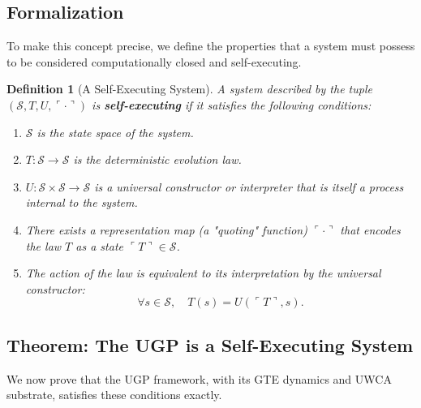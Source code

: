 \documentclass[12pt]{article}
\newtheorem{definition}[theorem]{Definition}
\begin{document}
\subsection{Formalization}
To make this concept precise, we define the properties that a system must possess to be considered computationally closed and self-executing.

\begin{definition}[A Self-Executing System]
\label{def:self_executing_system}
A system described by the tuple $(\mathcal{S}, T, U, \ulcorner \cdot \urcorner)$ is \textbf{self-executing} if it satisfies the following conditions:
\begin{enumerate}[label=(\roman*)]
    \item $\mathcal{S}$ is the state space of the system.
    \item $T: \mathcal{S} \to \mathcal{S}$ is the deterministic evolution law.
    \item $U: \mathcal{S} \times \mathcal{S} \to \mathcal{S}$ is a universal constructor or interpreter that is itself a process internal to the system.
    \item There exists a representation map (a "quoting" function) $\ulcorner \cdot \urcorner$ that encodes the law $T$ as a state $\ulcorner T \urcorner \in \mathcal{S}$.
    \item The action of the law is equivalent to its interpretation by the universal constructor:
    \begin{equation}
        \forall s \in \mathcal{S}, \quad T(s) = U(\ulcorner T \urcorner, s).
    \end{equation}
\end{enumerate}
\end{definition}

\subsection{Theorem: The UGP is a Self-Executing System}
We now prove that the UGP framework, with its GTE dynamics and UWCA substrate, satisfies these conditions exactly.
\end{document}
